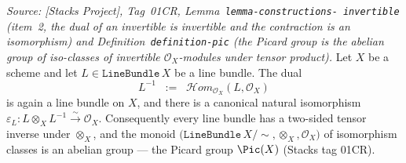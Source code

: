 \begin{lemma}




  \label{lem:tensorobj_inverse_invertible}
  \textit{Source: [Stacks Project], Tag~01CR, Lemma~\texttt{lemma-constructions-%
  invertible} (item~2, the dual of an invertible is invertible and the contraction
  is an isomorphism) and Definition~\texttt{definition-pic} (the Picard group is
  the abelian group of iso-classes of invertible \(\mathcal{O}_X\)-modules under
  tensor product).}
  Let \(X\) be a scheme and let \(L \in \texttt{LineBundle}\,X\) be a line
  bundle. The dual
  \[
    L^{-1} \;\;:=\;\; \mathcal{H}om_{\mathcal{O}_X}(L, \mathcal{O}_X)
  \]
  is again a line bundle on \(X\), and there is a canonical natural
  isomorphism
  \(\varepsilon_L : L \otimes_X L^{-1} \xrightarrow{\sim} \mathcal{O}_X\).
  Consequently every line bundle has a two-sided tensor inverse under
  \(\otimes_X\), and the monoid \(\bigl(\texttt{LineBundle}\,X / \sim, \otimes_X,
  \mathcal{O}_X\bigr)\) of isomorphism classes is an abelian group ---
  the Picard group \(\Pic(X)\) (Stacks tag 01CR).
\end{lemma}

